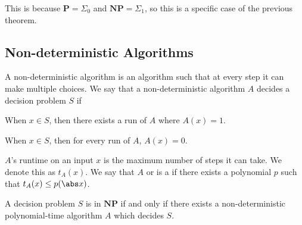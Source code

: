\documentclass[10pt]{article}
\def\P{\mathbf{P}}
\def\NP{\mathbf{NP}}
\begin{document}
This is because $\P=\Sigma_0$ and $\NP=\Sigma_1$, so this is a specific case of the previous theorem.

\subsection{Non-deterministic Algorithms}

\begin{defn*}

    A non-deterministic algorithm is an algorithm such that at every step it can make multiple choices.
    We say that a non-deterministic algorithm $A$ decides a decision problem $S$ if
    \benum
        \item When $x\in S$, then there exists a run of $A$ where $A(x)=1$.
        \item When $x\in S$, then for every run of $A$, $A(x)=0$.
    \eenum

    $A$'s runtime on an input $x$ is the maximum number of steps it can take.
    We denote this as $t_A(x)$.
    We say that $A$  or is a  if there exists a polynomial $p$ such that $t_A(x)\leq p(\abs x)$.

\end{defn*}

\begin{thrm*}

    A decision problem $S$ is in $\NP$ if and only if there exists a non-deterministic polynomial-time algorithm $A$ which decides $S$.

\end{thrm*}
\end{document}
